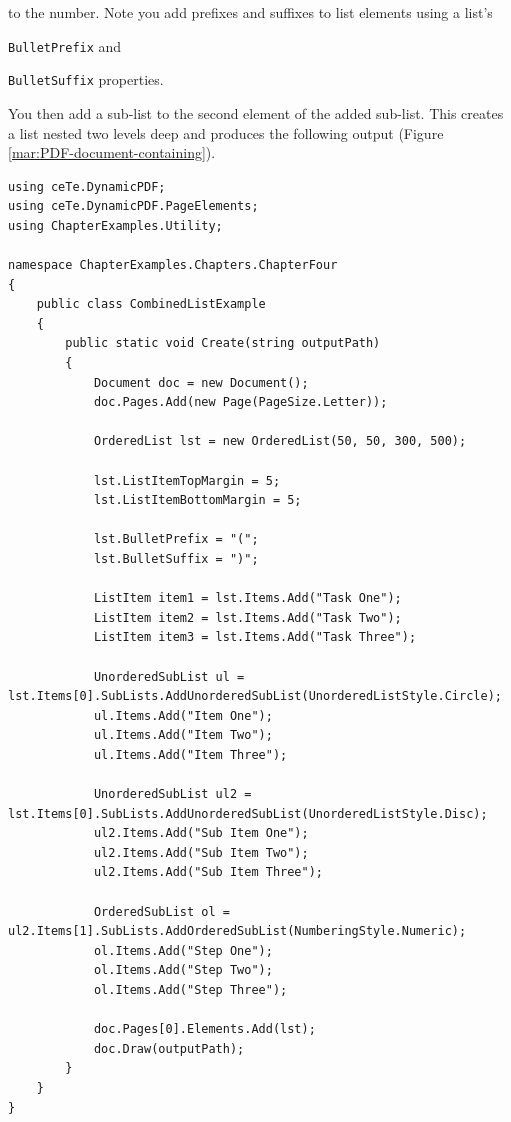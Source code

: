 \documentclass[american]{tufte-book}
\numberwithin{equation}{section}
\numberwithin{figure}{section}
\begin{document}
to the number. Note you add prefixes and suffixes to list elements using a list's  {\texttt{BulletPrefix} and {\texttt{BulletSuffix} properties.

You then add a sub-list to the second element of the added sub-list.
This creates a list nested two levels deep and produces the following
output (Figure \ref{mar:PDF-document-containing}).

\bgroup{}
\begin{lstlisting}[caption={A combined ordered and unordered list.},label={lis:List-combining-ordered},basicstyle={\footnotesize\ttfamily},breaklines=true]
using ceTe.DynamicPDF;
using ceTe.DynamicPDF.PageElements;
using ChapterExamples.Utility;

namespace ChapterExamples.Chapters.ChapterFour
{
    public class CombinedListExample
    {
        public static void Create(string outputPath)
        {
            Document doc = new Document();
            doc.Pages.Add(new Page(PageSize.Letter));

            OrderedList lst = new OrderedList(50, 50, 300, 500);

            lst.ListItemTopMargin = 5;
            lst.ListItemBottomMargin = 5;

            lst.BulletPrefix = "(";
            lst.BulletSuffix = ")";

            ListItem item1 = lst.Items.Add("Task One");
            ListItem item2 = lst.Items.Add("Task Two");
            ListItem item3 = lst.Items.Add("Task Three");

            UnorderedSubList ul = lst.Items[0].SubLists.AddUnorderedSubList(UnorderedListStyle.Circle);
            ul.Items.Add("Item One");
            ul.Items.Add("Item Two");
            ul.Items.Add("Item Three");

            UnorderedSubList ul2 = lst.Items[0].SubLists.AddUnorderedSubList(UnorderedListStyle.Disc);
            ul2.Items.Add("Sub Item One");
            ul2.Items.Add("Sub Item Two");
            ul2.Items.Add("Sub Item Three");

            OrderedSubList ol = ul2.Items[1].SubLists.AddOrderedSubList(NumberingStyle.Numeric);
            ol.Items.Add("Step One");
            ol.Items.Add("Step Two");
            ol.Items.Add("Step Three");

            doc.Pages[0].Elements.Add(lst);
            doc.Draw(outputPath);
        }
    }
}
\end{lstlisting}
\leavevmode\egroup


}}
\end{document}
